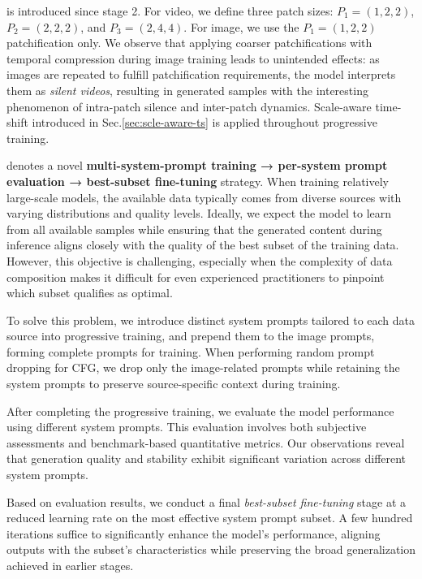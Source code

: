 \textbf{} is introduced since stage 2. For video, we define three patch sizes: \(P_1 = (1, 2, 2)\), \(P_2 = (2, 2, 2)\), and \(P_3 = (2, 4, 4)\). For image, we use the \(P_1 = (1, 2, 2)\) patchification only. We observe that applying coarser patchifications with temporal compression during image training leads to unintended effects: as images are repeated to fulfill patchification requirements, the model interprets them as \textit{silent videos}, resulting in generated samples with the interesting phenomenon of intra-patch silence and inter-patch dynamics. Scale-aware time-shift introduced in Sec.\ref{sec:scle-aware-ts} is applied throughout progressive training.

\textbf{} denotes a novel \textbf{multi-system-prompt training → per-system prompt evaluation → best-subset fine-tuning} strategy. When training relatively large-scale models, the available data typically comes from diverse sources with varying distributions and quality levels. Ideally, we expect the model to learn from all available samples while ensuring that the generated content during inference aligns closely with the quality of the best subset of the training data. However, this objective is challenging, especially when the complexity of data composition makes it difficult for even experienced practitioners to pinpoint which subset qualifies as optimal. 

To solve this problem, we introduce distinct system prompts tailored to each data source into progressive training, and prepend them to the image prompts, forming complete prompts for training. When performing random prompt dropping for CFG, we drop only the image-related prompts while retaining the system prompts to preserve source-specific context during training.

After completing the progressive training, we evaluate the model performance using different system prompts. This evaluation involves both subjective assessments and benchmark-based quantitative metrics. Our observations reveal that generation quality and stability exhibit significant variation across different system prompts.

Based on evaluation results, we conduct a final \textit{best-subset fine-tuning} stage at a reduced learning rate on the most effective system prompt subset. A few hundred iterations suffice to significantly enhance the model’s performance, aligning outputs with the subset’s characteristics while preserving the broad generalization achieved in earlier stages. 

